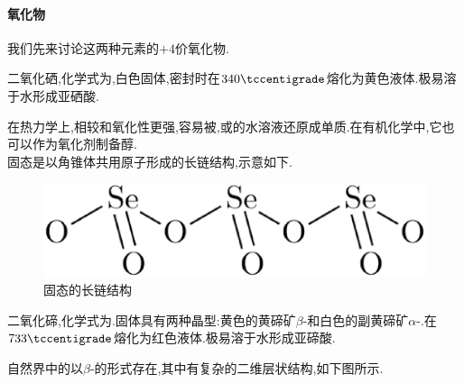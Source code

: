 \documentclass{ctexart}
\begin{document}
\paragraph{氧化物}我们先来讨论这两种元素的$+4$价氧化物.
\begin{substance}[\ce{SeO2}]
    二氧化硒,化学式为,白色固体,密封时在$340\tccentigrade$熔化为黄色液体.极易溶于水形成亚硒酸.
\end{substance}
在热力学上,相较和氧化性更强,容易被,或的水溶液还原成单质.在有机化学中,它也可以作为氧化剂制备醇.\\
\indent 固态是以角锥体共用原子形成的长链结构,示意如下.
\begin{figure}[H]
    \centering\includegraphics[scale=0.25]{picture/SeO2.eps}
    \caption{固态的长链结构}
\end{figure}
\begin{substance}[\ce{TeO2}]
    二氧化碲,化学式为.固体具有两种晶型:黄色的黄碲矿$\beta$-和白色的副黄碲矿$\alpha$-.在$733\tccentigrade$熔化为红色液体.极易溶于水形成亚碲酸.
\end{substance}
自然界中的以$\beta$-的形式存在,其中有复杂的二维层状结构,如下图所示.
\end{document}
